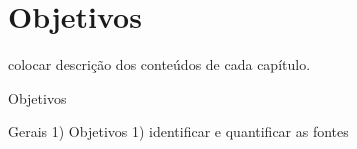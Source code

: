 \section{Objetivos}


colocar descrição dos conteúdos de cada capítulo.

Objetivos

  Gerais
  1) 
  Objetivos 
  1) identificar e quantificar as fontes 